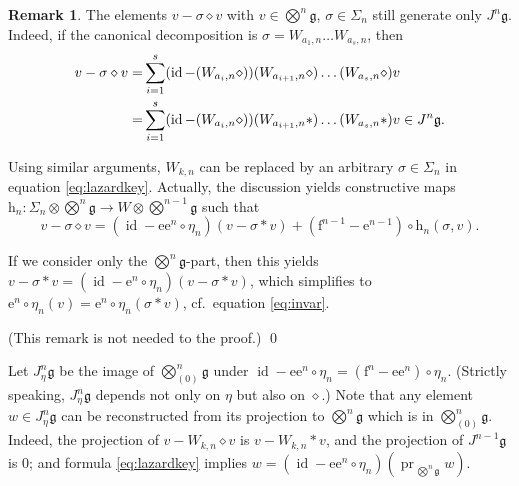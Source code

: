 \documentclass[11pt,a4paper]{amsart}
\newcommand{\plabel}[1]{ \label{#1}}
\newcommand{\snewpage}{}
\newcommand{\plabel}[1]{ \label{#1}\rlap{\smash{${}^{^{[#1]}}$}}}
\newcommand{\snewpage}{\newpage}
\newenvironment{commentx}{\color{magenta} }{\color{black} }
\newcommand{\plabel}[1]{ \label{#1}}
\newcommand{\snewpage}{}
\DeclareMathOperator{\proj}{pr}
\DeclareMathOperator{\id}{id}
\newcommand{\botimes}{{\textstyle\bigotimes}}
\theoremstyle{definition}
\newtheorem{remark}[point]{Remark}
\theoremstyle{plain}
\newcommand{\qedremark}{  \renewcommand{\qedsymbol}{$\triangle$} \qed \renewcommand{\qedsymbol}{$\Box$}}
\begin{document}
\begin{commentx}
\begin{remark}\plabel{rem:lazardkey}
The elements  $v-\sigma\diamond v$  with $v\in \botimes^n\mathfrak g$, $\sigma\in\Sigma_n$ still
generate only $J^{n}\mathfrak g$.
Indeed, if the canonical decomposition is $\sigma=W_{a_1,n}\ldots W_{a_s,n}$, then
\begin{align}\notag
v-\sigma\diamond v =&\sum_{i=1}^s  (\id- (W_{a_i,n}\diamond)) (W_{a_{i+1},n}\diamond) \ldots (W_{a_s,n}\diamond)v\\
=&\sum_{i=1}^s  (\id- (W_{a_i,n}\diamond)) (W_{a_{i+1},n}*) \ldots (W_{a_s,n}*)v\in J^{n}\mathfrak g.
\notag\end{align}

Using similar arguments, $W_{k,n}$ can be replaced by an arbitrary $\sigma\in\Sigma_n$ in equation \eqref{eq:lazardkey}.
Actually, the discussion yields constructive maps $\mathrm h_n:\Sigma_n\otimes\botimes^{n}\mathfrak g\rightarrow W\otimes\botimes^{n-1}\mathfrak g$
such that
\[v-\sigma\diamond v=(\id- \mathrm e\mathrm e^{n}\circ\eta_n)(v-\sigma*v)+(\mathrm f^{n-1}- \mathrm e^{n-1})\circ \mathrm h_n(\sigma,v) .\]


If we consider only the $\botimes^n\mathfrak g$-part, then this yields
 $v-\sigma* v=(\id- \mathrm e^{n}\circ\eta_n)(v-\sigma*v)$, which simplifies to $\mathrm e^{n}\circ\eta_n(v)=\mathrm e^{n}\circ\eta_n(\sigma*v)$, cf.~equation \eqref{eq:invar}.

(This remark is not needed to the proof.)\qedremark
\end{remark}
\end{commentx}
Let $J_{\eta}^n\mathfrak g$ be the image of $\botimes^n_{(0)}\mathfrak g$ under   $\id- \mathrm e\mathrm e^{n}\circ\eta_n=(\mathrm f^n-\mathrm e\mathrm e^n)\circ\eta_n$.
(Strictly speaking, $J_{\eta}^n\mathfrak g$  depends not only on $\eta$ but also on $\diamond$.)
Note that any element $w\in J_{\eta}^n\mathfrak g$ can be reconstructed from its projection to $\botimes^n\mathfrak g$ which is in $\botimes^n_{(0)}\mathfrak g$.
Indeed, the projection of $v-W_{k,n}\diamond v$ is $v-W_{k,n}* v$, and the projection of $J^{n-1}\mathfrak g$ is $0$; and formula \eqref{eq:lazardkey} implies
$w= (\id- \mathrm e\mathrm e^{n}\circ\eta_n)(\proj_{\,\bigotimes^n\mathfrak g}w)$.
\end{document}
